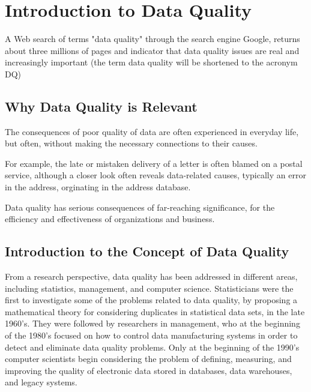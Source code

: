 

\ifpdf
    \graphicspath{{Chapter1/Figs/Raster/}{Chapter1/Figs/PDF/}{Chapter1/Figs/}}
\else
    \graphicspath{{Chapter1/Figs/Vector/}{Chapter1/Figs/}}
\fi

\chapter{Introduction to Data Quality}

A Web search of terms "data quality" through the search engine Google, returns about three millions of pages
and indicator that data quality issues are real and increasingly important (the term data quality will be shortened to the acronym DQ)

\ifpdf
    \graphicspath{{Chapter1/Figs/Raster/}{Chapter1/Figs/PDF/}{Chapter1/Figs/}}
\else
    \graphicspath{{Chapter1/Figs/Vector/}{Chapter1/Figs/}}
\fi

\section{Why Data Quality is Relevant}

The consequences of poor quality of data are often experienced in everyday life, but often, without making the necessary connections to their causes.

For example, the late or mistaken delivery of a letter is often blamed on a postal service, although  a closer look often reveals data-related causes, typically an error in the address, orginating in the address database.

Data quality has serious consequences of far-reaching significance, for the efficiency and effectiveness of organizations and business.

\section{Introduction to the Concept of Data Quality}

From a research perspective, data quality has been addressed in different
areas, including statistics, management, and computer science. Statisticians were the first to investigate some of the problems related to data quality, by
proposing a mathematical theory for considering duplicates in statistical data sets, in the late 1960's. They were followed by researchers in management, who
at the beginning of the 1980's focused on how to control data manufacturing systems in order to detect and eliminate data quality problems. Only at the
beginning of the 1990's computer scientists begin considering the problem of defining, measuring, and improving the quality of electronic data stored in
databases, data warehouses, and legacy systems.~\citep{CBMS}

